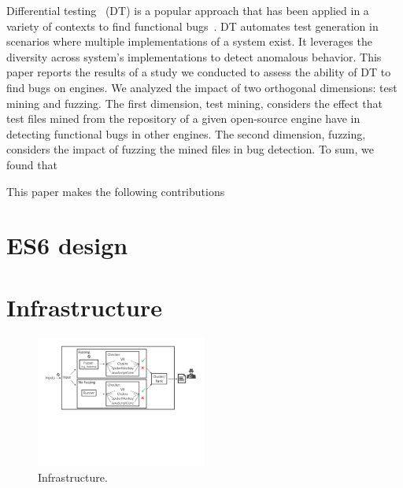 \documentclass[10pt,conference,anonymous]{IEEEtran}
\begin{document}
Differential testing~\cite{Brumley-etal-ss07} (DT) is a popular
approach that has been applied in a variety of contexts to find
functional
bugs~\cite{Yang-etal-pldi11,Chen-etal-fse2015,Argyros-etla-ccs16,Chen-etal-pldi16,petsios-etal-sp2017,SivakornAPKJ17}. DT
automates test generation in scenarios where multiple implementations
of a system exist. It leverages the diversity across system's
implementations to detect anomalous behavior.
This paper reports the results of a study we conducted to assess the
ability of DT to find bugs on \js{} engines.  We analyzed
the impact of two orthogonal dimensions: test mining and fuzzing. The
first dimension, test mining, considers the effect that \js{} test
files mined from the repository of a given open-source engine have in
detecting functional bugs in other engines. The second dimension,
fuzzing, considers the impact of fuzzing the mined files in bug
detection.
To sum, we found that 

This paper makes the following contributions 

\section{ES6 design}

\section{Infrastructure}
\label{sec:design}


\begin{figure}[t]
  \centering
  \includegraphics[trim=0 250 0 0,clip,width=0.5\textwidth]{google-awards-workflow}  
  \caption{\label{fig:workflow}Infrastructure.}
\end{figure}
\end{document}
